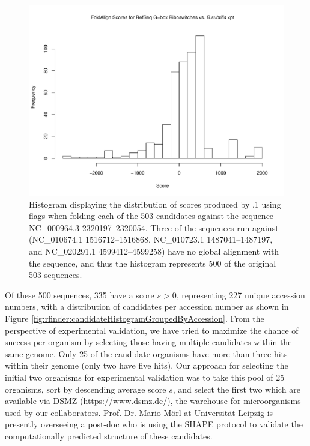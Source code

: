 \begin{figure}[!ht]
\centering
\includegraphics[width=.9\textwidth]{Figures/Ribofinder/histogramFoldalignCandidatesVsXpt.pdf}
\caption{Histogram displaying the distribution of scores produced by .1 using flags  when folding each of
the 503 candidates against the \Bsxpt sequence NC\_000964.3 2320197--2320054.
Three of the sequences run against \foldalign (NC\_010674.1 1516712--1516868,
NC\_010723.1 1487041--1487197, and NC\_020291.1 4599412--4599258) have no global
alignment with the \Bsxpt sequence, and thus the histogram represents 500 of the
original 503 sequences.}
\label{fig:rfinder:histogramFoldalignCandidatesVsXpt}
\end{figure}

Of these 500 sequences, 335 have a \foldalign score $s > 0$, representing 227
unique accession numbers, with a distribution of candidates per accession number
as shown in Figure \ref{fig:rfinder:candidateHistogramGroupedByAccession}. From
the perspective of experimental validation, we have tried to maximize the chance
of success per organism by selecting those having multiple candidates within the
same genome. Only 25 of the candidate organisms have more than three hits within
their genome (only two have five hits). Our approach for selecting the initial
two organisms for experimental validation was to take this pool of 25 organisms,
sort by descending average score $s$, and select the first two which are available
via DSMZ (\url{https://www.dsmz.de/}), the warehouse for microorganisms used by
our collaborators. Prof. Dr. Mario M\"orl at Universit\"at Leipzig is presently
overseeing a post-doc who is using the SHAPE protocol \citep{wilkinson:2006vd} to
validate the computationally predicted structure of these candidates.

